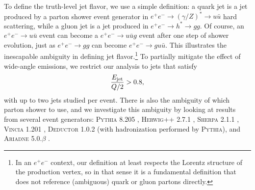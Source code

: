 \documentclass[11pt]{cernrep}
\begin{document}
To define the truth-level jet flavor, we use a simple definition:  a quark jet is a jet produced by a parton shower event generator in $e^+ e^- \to (\gamma/Z)^* \to u \bar{u}$ hard scattering, while a gluon jet is a jet produced in $e^+ e^- \to h^* \to gg$.  Of course, an $e^+e^- \to u \bar u$ event can become a $e^+e^- \to u \bar u g$ event after one step of shower evolution, just as $e^+e^- \to g g$ can become $e^+e^- \to g u \bar u$.  This illustrates the inescapable ambiguity in defining jet flavor.\footnote{In an $e^+e^-$ context, our definition at least respects the Lorentz structure of the production vertex, so in that sense it is a fundamental definition that does not reference (ambiguous) quark or gluon partons directly.}  To partially mitigate the effect of wide-angle emissions, we restrict our analysis to jets that satisfy
\begin{equation}
\frac{E_{\rm jet}}{Q/2} > 0.8,
\end{equation}
with up to two jets studied per event.  There is also the ambiguity of which parton shower to use, and we investigate this ambiguity by looking at results from several event generators:  \textsc{Pythia 8.205} \cite{Sjostrand:2006za,Sjostrand:2014zea}, \textsc{Herwig++ 2.7.1} \cite{Bahr:2008pv,Bellm:2013hwb}, \textsc{Sherpa 2.1.1} \cite{Gleisberg:2008ta}, \textsc{Vincia 1.201} \cite{Giele:2013ema}, \textsc{Deductor 1.0.2} \cite{Nagy:2014mqa} (with hadronization performed by \textsc{Pythia}), and \textsc{Ariadne 5.0.$\beta$} \cite{Flensburg:2011kk}.
\end{document}

